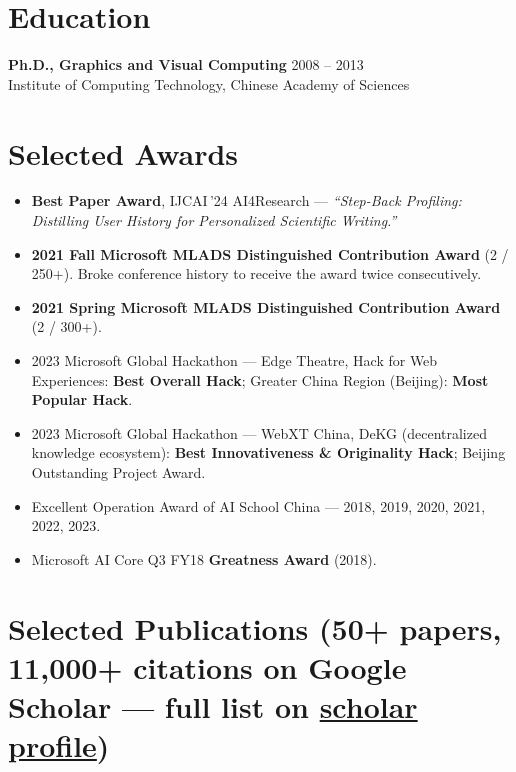 \documentclass[10.5pt,letterpaper]{article}
\begin{document}
\section*{Education}
\noindent\textbf{Ph.D., Graphics and Visual Computing} \hfill 2008 -- 2013\\
Institute of Computing Technology, Chinese Academy of Sciences

\section*{Selected Awards}
\begin{itemize}
  \item \textbf{Best Paper Award}, IJCAI\,'24 AI4Research --- \textit{``Step-Back Profiling: Distilling User History for Personalized Scientific Writing.''}
  \item \textbf{2021 Fall Microsoft MLADS Distinguished Contribution Award} (2 / 250+). Broke conference history to receive the award twice consecutively.
  \item \textbf{2021 Spring Microsoft MLADS Distinguished Contribution Award} (2 / 300+).
  \item 2023 Microsoft Global Hackathon --- Edge Theatre, Hack for Web Experiences: \textbf{Best Overall Hack}; Greater China Region (Beijing): \textbf{Most Popular Hack}.
  \item 2023 Microsoft Global Hackathon --- WebXT China, DeKG (decentralized knowledge ecosystem): \textbf{Best Innovativeness \& Originality Hack}; Beijing Outstanding Project Award.
  \item Excellent Operation Award of AI School China --- 2018, 2019, 2020, 2021, 2022, 2023.
  \item Microsoft AI Core Q3 FY18 \textbf{Greatness Award} (2018).
\end{itemize}

\section*{Selected Publications (50+ papers, 11{,}000+ citations on Google Scholar --- full list on \href{https://scholar.google.com/citations?user=c7JEFwsAAAAJ}{scholar profile})}
\end{document}
